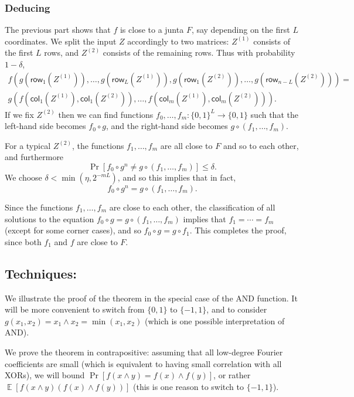 \documentclass{article}
\theoremstyle{definition}
\theoremstyle{remark}
\providecommand{\row}{\mathsf{row}}
\providecommand{\col}{\mathsf{col}}
\DeclareMathOperator*{\E}{\mathbb{E}}
\renewcommand\leq{\leqslant}
\begin{document}
\subsubsection{Deducing }
The previous part shows that $f$ is close to a junta $F$, say depending on the first $L$ coordinates. We split the input $Z$ accordingly to two matrices: $Z^{(1)}$ consists of the first $L$ rows, and $Z^{(2)}$ consists of the remaining rows. Thus with probability $1-\delta$,
\begin{multline*}
 f(g(\row_1(Z^{(1)})),\ldots,g(\row_L(Z^{(1)})), g(\row_1(Z^{(2)})),\ldots,g(\row_{n-L}(Z^{(2)}))) = \\ g(f(\col_1(Z^{(1)}),\col_1(Z^{(2)})),\ldots,f(\col_m(Z^{(1)}),\col_m(Z^{(2)}))).
\end{multline*}
If we fix $Z^{(2)}$ then we can find functions $f_0,\ldots,f_m\colon \{0,1\}^L \to \{0,1\}$ such that the left-hand side becomes $f_0 \circ g$, and the right-hand side becomes $g \circ (f_1,\ldots,f_m)$.

For a typical $Z^{(2)}$, the functions $f_1,\ldots,f_m$ are all close to $F$ and so to each other, and furthermore
\[
 \Pr[f_0 \circ g^{n} \neq g \circ (f_1,\ldots,f_m)] \leq \delta.
\]
We choose $\delta < \min(\eta,2^{-mL})$, and so this implies that in fact,
\[
 f_0 \circ g^{n} = g \circ (f_1,\ldots,f_m).
\]

Since the functions $f_1,\ldots,f_m$ are close to each other, the classification of all solutions to the equation $f_0 \circ g = g \circ (f_1,\ldots,f_m)$ implies that $f_1 = \cdots = f_m$ (except for some corner cases), and so $f_0 \circ g = g \circ f_1$. This completes the proof, since both $f_1$ and $f$ are close to $F$.

\subsection{Techniques: }

We illustrate the proof of the theorem in the special case of the AND function. It will be more convenient to switch from $\{0,1\}$ to $\{-1,1\}$, and to consider $g(x_1,x_2) = x_1 \land x_2 = \min(x_1,x_2)$ (which is one possible interpretation of AND).

We prove the theorem in contrapositive: assuming that all low-degree Fourier coefficients are small (which is equivalent to having small correlation with all XORs), we will bound $\Pr[f(x \land y) = f(x) \land f(y)]$, or rather $\E[f(x \land y) (f(x) \land f(y))]$ (this is one reason to switch to $\{-1,1\}$).
\end{document}
